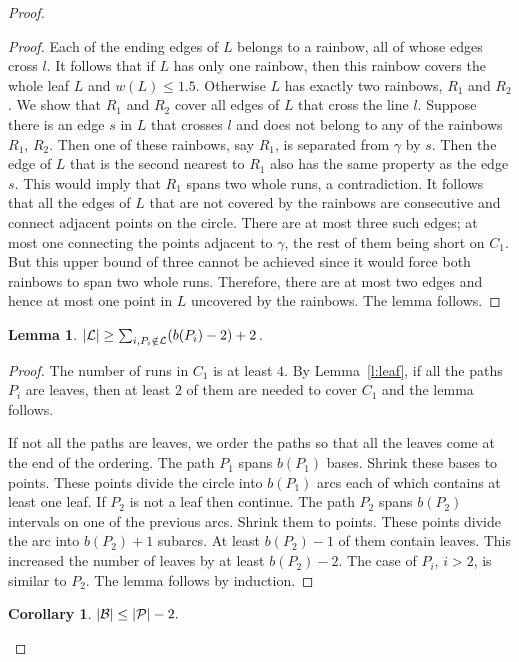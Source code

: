 \documentclass[12pt]{article}
\newtheorem{lemma}[theorem]{Lemma}
\newtheorem{corollary}[theorem]{Corollary}
\begin{document}
\begin{proof}
\begin{proof}
Each of the ending edges of $L$ belongs to a rainbow, all of whose edges cross $l$. It follows that if $L$ has only one rainbow, then this rainbow covers the whole leaf $L$ and $w(L) \le 1.5$.
Otherwise $L$ has exactly two rainbows, $R_1$ and $R_2$. We show that $R_1$ and $R_2$ cover all edges of $L$ that cross the line $l$. Suppose there is an edge $s$ in $L$ that crosses $l$ and does not belong to any of the rainbows $R_1$, $R_2$. Then one of these rainbows, say $R_1$, is separated from $\gamma$ by $s$. Then the edge of $L$ that is the second nearest to $R_1$ also has the same property as the edge $s$. This would imply that $R_1$ spans two whole runs, a contradiction. It follows that all the edges of $L$ that are not covered by the rainbows are consecutive and connect adjacent points on the circle. There are at most three such edges; at most one connecting the points adjacent to $\gamma$, the rest of them being short on $C_1$. But this upper bound of three cannot be achieved since it would force both rainbows to span two whole runs. Therefore, there are at most two edges and hence at most one point in $L$ uncovered by the rainbows. The lemma follows.
\end{proof}


\begin{lemma}\label{l:leaves}
$|{\cal L}| \geq \sum_{i, P_i \notin {\cal L}}(b(P_i)-2) + 2$.
\end{lemma}

\begin{proof}
The number of runs in $C_1$ is at least $4$. By Lemma~\ref{l:leaf}, if all the paths $P_i$ are leaves, then at least $2$ of them are needed to cover $C_1$ and the lemma follows. 

If not all the paths are leaves, we order the paths so that all the leaves come at the end of the ordering. 
The path $P_1$ spans $b(P_1)$ bases. Shrink these bases to points. These points divide the circle into $b(P_1)$ arcs each of which contains at least one leaf. If $P_2$ is not a leaf then continue. The path $P_2$ spans $b(P_2)$ intervals on one of the previous arcs. Shrink them to points. These points divide the arc into $b(P_2)+1$ subarcs. At least $b(P_2)-1$ of them contain leaves. This increased the number of leaves by at least $b(P_2)-2$. The case of $P_i$, $i>2$, is similar to $P_2$. The lemma follows by induction.
\end{proof}





\begin{corollary} 
$|{\cal B}|\leq |{\cal P}|-2.$
\end{corollary}


\end{proof}
\end{document}
